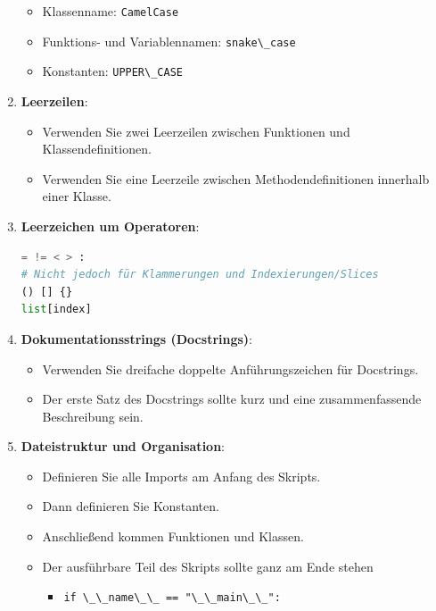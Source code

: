 \documentclass{vorlage-design-main}
\begin{document}
\begin{enumerate}
  \begin{itemize}

  \item
    Klassenname: \verb|CamelCase|
  \item
    Funktions- und Variablennamen: \verb|snake\_case|
  \item
    Konstanten: \verb|UPPER\_CASE|
  \end{itemize}
\item
  \textbf{Leerzeilen}:

  \begin{itemize}

  \item
    Verwenden Sie zwei Leerzeilen zwischen Funktionen und
    Klassendefinitionen.
  \item
    Verwenden Sie eine Leerzeile zwischen Methodendefinitionen innerhalb
    einer Klasse.
  \end{itemize}
\item
  \textbf{Leerzeichen um Operatoren}:

\begin{lstlisting}[language=Python]
= != < > :
# Nicht jedoch für Klammerungen und Indexierungen/Slices
() [] {}
list[index]
\end{lstlisting}
\item
  \textbf{Dokumentationsstrings (Docstrings)}:

  \begin{itemize}

  \item
    Verwenden Sie dreifache doppelte Anführungszeichen für Docstrings.
  \item
    Der erste Satz des Docstrings sollte kurz und eine zusammenfassende
    Beschreibung sein.
  \end{itemize}
\item
  \textbf{Dateistruktur und Organisation}:

  \begin{itemize}

  \item
    Definieren Sie alle Imports am Anfang des Skripts.
  \item
    Dann definieren Sie Konstanten.
  \item
    Anschließend kommen Funktionen und Klassen.
  \item
    Der ausführbare Teil des Skripts sollte ganz am Ende stehen

    \begin{itemize}

    \item
      \verb|if \_\_name\_\_ == "\_\_main\_\_":|
    \end{itemize}
  \end{itemize}
\end{enumerate}
\end{document}
